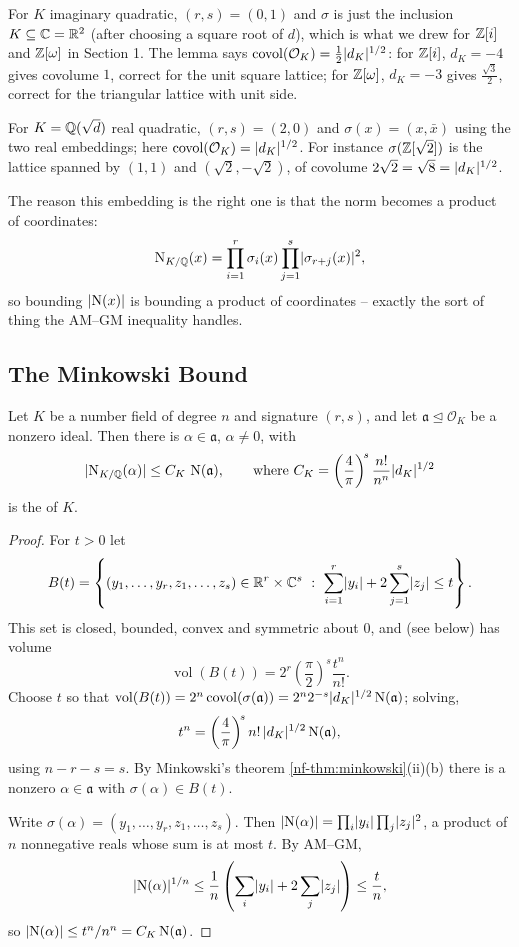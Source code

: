 \documentclass[a4paper]{scrartcl}
\renewcommand{\OO}{\mathcal{O}}
\newcommand{\Nm}{\operatorname{N}}
\newcommand{\vol}{\operatorname{vol}}
\newcommand{\covol}{\operatorname{covol}}
\newcommand{\fa}{\mathfrak{a}}
\begin{document}
\begin{example}
	For $K$ imaginary quadratic, $(r,s) = (0,1)$ and $\sigma$ is just the inclusion $K \subseteq \mathbb{C} = \mathbb{R}^2$ (after choosing a square root of $d$), which is what we drew for $\mathbb{Z}[i]$ and $\mathbb{Z}[\omega]$ in Section 1. The lemma says $\covol(\OO_K) = \tfrac12\abs{d_K}^{1/2}$: for $\mathbb{Z}[i]$, $d_K = -4$ gives covolume $1$, correct for the unit square lattice; for $\mathbb{Z}[\omega]$, $d_K=-3$ gives $\tfrac{\sqrt3}{2}$, correct for the triangular lattice with unit side.

	For $K = \mathbb{Q}(\sqrt d)$ real quadratic, $(r,s) = (2,0)$ and $\sigma(x) = (x, \bar x)$ using the two real embeddings; here $\covol(\OO_K) = \abs{d_K}^{1/2}$. For instance $\sigma(\mathbb{Z}[\sqrt2])$ is the lattice spanned by $(1,1)$ and $(\sqrt2,-\sqrt2)$, of covolume $2\sqrt2 = \sqrt 8 = \lvert d_K\rvert^{1/2}$.
\end{example}

The reason this embedding is the right one is that the norm becomes a product of coordinates:
$$\Nm_{K/\Q}(x) = \prod_{i=1}^r\sigma_i(x)\prod_{j=1}^s\abs{\sigma_{r+j}(x)}^2,$$
so bounding $\abs{\Nm(x)}$ is bounding a product of coordinates -- exactly the sort of thing the AM--GM inequality handles.

\subsection{The Minkowski Bound}

\begin{proposition}\label{prop:minkbound}
	Let $K$ be a number field of degree $n$ and signature $(r,s)$, and let $\fa \trianglelefteq \OO_K$ be a nonzero ideal. Then there is $\alpha \in \fa$, $\alpha \neq 0$, with
	$$\abs{\Nm_{K/\Q}(\alpha)} \le C_K\,\Nm(\fa), \qquad \text{where } C_K = \left(\frac4\pi\right)^{\!s}\frac{n!}{n^n}\abs{d_K}^{1/2}$$
	is the  of $K$.
\end{proposition}

\begin{proof}
	For $t > 0$ let
	$$B(t) = \left\{(y_1,\dots,y_r,z_1,\dots,z_s) \in \R^r\times\C^s\ :\ \sum_{i=1}^r\abs{y_i} + 2\sum_{j=1}^s\abs{z_j} \le t\right\}.$$
	This set is closed, bounded, convex and symmetric about $0$, and (see below) has volume
	$$\vol(B(t)) = 2^r\left(\frac\pi2\right)^{\!s}\frac{t^n}{n!}.$$
	Choose $t$ so that $\vol(B(t)) = 2^n\covol(\sigma(\fa)) = 2^n2^{-s}\abs{d_K}^{1/2}\Nm(\fa)$; solving,
	$$t^n = \left(\frac4\pi\right)^{\!s}n!\,\abs{d_K}^{1/2}\Nm(\fa),$$
	using $n - r - s = s$. By Minkowski's theorem \ref{nf-thm:minkowski}(ii)(b) there is a nonzero $\alpha \in \fa$ with $\sigma(\alpha) \in B(t)$.

	Write $\sigma(\alpha) = (y_1,\dots,y_r,z_1,\dots,z_s)$. Then $\abs{\Nm(\alpha)} = \prod_i\abs{y_i}\prod_j\abs{z_j}^2$, a product of $n$ nonnegative reals whose sum is at most $t$. By AM--GM,
	$$\abs{\Nm(\alpha)}^{1/n} \le \frac1n\left(\sum_i\abs{y_i}+2\sum_j\abs{z_j}\right)\le\frac tn,$$
	so $\abs{\Nm(\alpha)} \le t^n/n^n = C_K\Nm(\fa)$.
\end{proof}
\end{document}
